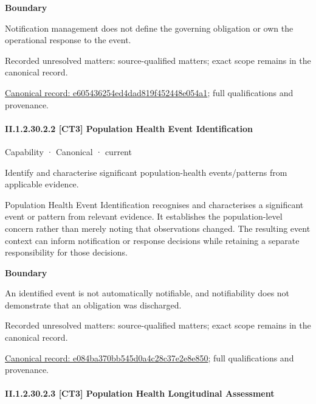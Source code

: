 \textbf{Boundary}



Notification management does not define the governing obligation or own the operational response to the event.


{\small Recorded unresolved matters: source-qualified matters; exact scope remains in the canonical record.}\par
{\footnotesize \href{../../../../continuum/strategy/capability/e605436254ed4dad819f452448e054a1.md}{Canonical record: e605436254ed4dad819f452448e054a1}; full qualifications and provenance.}\par
\paragraph*{II.1.2.30.2.2 [CT3] Population Health Event Identification}
\label{navigation:II.1.2.30.2.2}

\label{element:e084ba370bb545d0a4c28c37e2e8e850}
{\small Capability · Canonical · current}\par

Identify and characterise significant population-health events/patterns from applicable evidence.



Population Health Event Identification recognises and characterises a significant event or pattern from relevant evidence. It establishes the population-level concern rather than merely noting that observations changed. The resulting event context can inform notification or response decisions while retaining a separate responsibility for those decisions.



\textbf{Boundary}



An identified event is not automatically notifiable, and notifiability does not demonstrate that an obligation was discharged.


{\small Recorded unresolved matters: source-qualified matters; exact scope remains in the canonical record.}\par
{\footnotesize \href{../../../../continuum/strategy/capability/e084ba370bb545d0a4c28c37e2e8e850.md}{Canonical record: e084ba370bb545d0a4c28c37e2e8e850}; full qualifications and provenance.}\par
\paragraph*{II.1.2.30.2.3 [CT3] Population Health Longitudinal Assessment}
\label{navigation:II.1.2.30.2.3}

